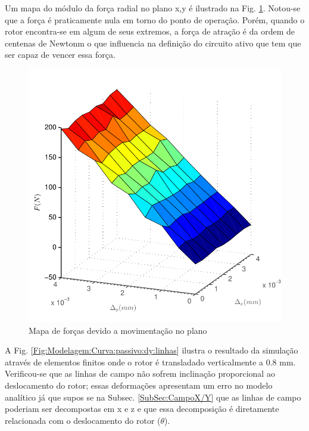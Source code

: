 Um mapa do módulo da força radial no plano x,y é ilustrado na Fig. \ref{fig:passivo_otimizado_fem_plano}. Notou-se que a força é praticamente nula em torno do ponto de operação. Porém, quando o rotor encontra-se em algum de seus extremos, a força de atração é da ordem de centenas de Newtonm o que influencia na definição do circuito ativo que tem que ser capaz de vencer essa força.

\begin{figure}[!ht]
\centering
\includegraphics[width=0.7\linewidth]{Figs/Simulacoes/Passivo2/passivo_otimizado_fem_plano}
\caption{Mapa de forças devido a movimentação no plano}
\label{fig:passivo_otimizado_fem_plano}
\end{figure} 

A Fig. \ref{Fig:Modelagem:Curva:passivo:dy:linhas} ilustra o resultado da simulação através de elementos finitos onde o rotor é transladado verticalmente a 0.8 mm. Verificou-se que as linhas de campo não sofrem inclinação proporcional ao deslocamento do rotor; essas deformações apresentam um erro no modelo analítico já que supos se na Subsec. \ref{SubSec:CampoX/Y} que as linhas de campo poderiam ser decompostas em x e z e que essa decomposição é diretamente relacionada com o deslocamento do rotor ($\theta$). 

